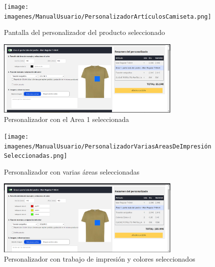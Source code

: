 \documentclass[12pt]{article}
\begin{document}
\begin{figure}[ht]
    \centering
    \texttt{[image: imagenes/ManualUsuario/PersonalizadorArtículosCamiseta.png]}
    \caption{\label{fig:Personalizador}Pantalla del personalizador del producto seleccionado}
    \vspace{\fill}
\end{figure}

\begin{figure}[ht]
    \centering
    \includegraphics[width=0.8\textwidth]{imagenes/ManualUsuario/PersonalizadorArea1Seleccionada.png}
    \caption{\label{fig:PersonalizadorAreaMarcada}Personalizador con el Area 1 seleccionada}
    \vspace{\fill}
\end{figure}

\begin{figure}[ht]
    \centering
    \texttt{[image: imagenes/ManualUsuario/PersonalizadorVariasAreasDeImpresiónSeleccionadas.png]}
    \caption{\label{fig:PersonalizadorVariasAreas}Personalizador con varias áreas seleccionadas}
    \vspace{\fill}
\end{figure}

\begin{figure}[ht]
    \centering
    \includegraphics[width=0.8\textwidth]{imagenes/ManualUsuario/PersonalizadorArea1ColoresSeleccionados.png}
    \caption{\label{fig:PersonalizadorColores}Personalizador con trabajo de impresión y colores seleccionados}
    \vspace{\fill}
\end{figure}
\end{document}
